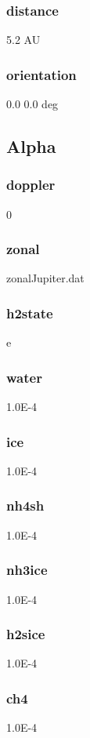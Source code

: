 \documentclass[11pt]{article}
\begin{document}
\subsubsection{distance}
5.2 AU
\subsubsection{orientation}
0.0 0.0 deg

\subsection{Alpha}
\subsubsection{doppler}
0

\subsubsection{zonal}
    zonalJupiter.dat

\subsubsection{h2state}
e

\subsubsection{water}
1.0E-4

\subsubsection{ice}
1.0E-4

\subsubsection{nh4sh}
1.0E-4

\subsubsection{nh3ice}
1.0E-4

\subsubsection{h2sice}
1.0E-4

\subsubsection{ch4 }
1.0E-4
\end{document}
